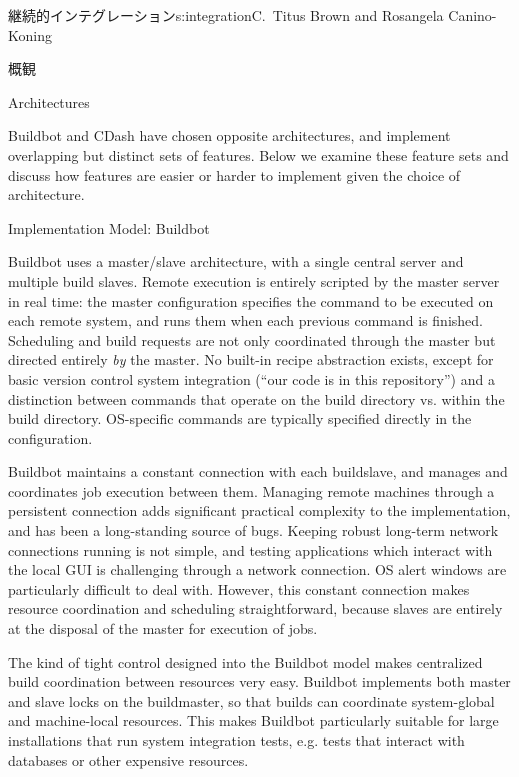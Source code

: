 \begin{aosachapter}{継続的インテグレーション}{s:integration}{C.\ Titus Brown and Rosangela Canino-Koning}
\begin{aosasect1}{概観}
\end{aosasect1}

\begin{aosasect1}{Architectures}

Buildbot and CDash have chosen opposite architectures, and implement
overlapping but distinct sets of features. Below we examine these
feature sets and discuss how features are easier or harder to
implement given the choice of architecture.

\begin{aosasect2}{Implementation Model: Buildbot}


Buildbot uses a master/slave architecture, with a single central
server and multiple build slaves. Remote execution is entirely
scripted by the master server in real time: the master configuration
specifies the command to be executed on each remote system, and runs
them when each previous command is finished. Scheduling and build
requests are not only coordinated through the master but directed
entirely \emph{by} the master. No built-in recipe abstraction exists,
except for basic version control system integration (``our code is in
this repository'') and a distinction between commands that operate on
the build directory vs. within the build directory. OS-specific
commands are typically specified directly in the configuration.

Buildbot maintains a constant connection with each buildslave, and
manages and coordinates job execution between them.  Managing remote
machines through a persistent connection adds significant practical
complexity to the implementation, and has been a long-standing source
of bugs.  Keeping robust long-term network connections running is not
simple, and testing applications which interact with the local GUI is
challenging through a network connection. OS alert windows are
particularly difficult to deal with.  However, this constant
connection makes resource coordination and scheduling straightforward,
because slaves are entirely at the disposal of the master for
execution of jobs.

The kind of tight control designed into the Buildbot model makes
centralized build coordination between resources very easy. Buildbot
implements both master and slave locks on the buildmaster, so that
builds can coordinate system-global and machine-local resources. This
makes Buildbot particularly suitable for large installations that run
system integration tests, e.g. tests that interact with databases or
other expensive resources.


\end{aosasect2}
\end{aosasect1}
\end{aosachapter}
